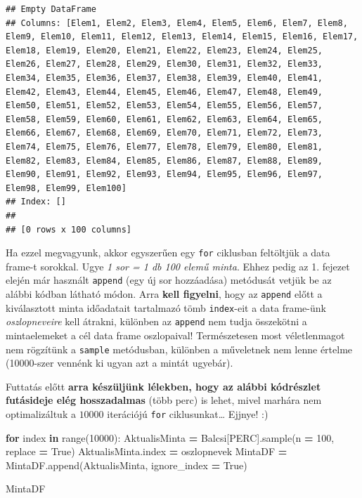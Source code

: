 \documentclass[
]{book}
\newenvironment{Shaded}{\begin{snugshade}}{\end{snugshade}}
\newcommand{\BuiltInTok}[1]{#1}
\newcommand{\ControlFlowTok}[1]{\textcolor[rgb]{0.13,0.29,0.53}{\textbf{#1}}}
\newcommand{\DecValTok}[1]{\textcolor[rgb]{0.00,0.00,0.81}{#1}}
\newcommand{\KeywordTok}[1]{\textcolor[rgb]{0.13,0.29,0.53}{\textbf{#1}}}
\newcommand{\NormalTok}[1]{#1}
\newcommand{\OperatorTok}[1]{\textcolor[rgb]{0.81,0.36,0.00}{\textbf{#1}}}
\newcommand{\StringTok}[1]{\textcolor[rgb]{0.31,0.60,0.02}{#1}}
\newcommand{\VariableTok}[1]{\textcolor[rgb]{0.00,0.00,0.00}{#1}}
\begin{document}
\begin{verbatim}
## Empty DataFrame
## Columns: [Elem1, Elem2, Elem3, Elem4, Elem5, Elem6, Elem7, Elem8, Elem9, Elem10, Elem11, Elem12, Elem13, Elem14, Elem15, Elem16, Elem17, Elem18, Elem19, Elem20, Elem21, Elem22, Elem23, Elem24, Elem25, Elem26, Elem27, Elem28, Elem29, Elem30, Elem31, Elem32, Elem33, Elem34, Elem35, Elem36, Elem37, Elem38, Elem39, Elem40, Elem41, Elem42, Elem43, Elem44, Elem45, Elem46, Elem47, Elem48, Elem49, Elem50, Elem51, Elem52, Elem53, Elem54, Elem55, Elem56, Elem57, Elem58, Elem59, Elem60, Elem61, Elem62, Elem63, Elem64, Elem65, Elem66, Elem67, Elem68, Elem69, Elem70, Elem71, Elem72, Elem73, Elem74, Elem75, Elem76, Elem77, Elem78, Elem79, Elem80, Elem81, Elem82, Elem83, Elem84, Elem85, Elem86, Elem87, Elem88, Elem89, Elem90, Elem91, Elem92, Elem93, Elem94, Elem95, Elem96, Elem97, Elem98, Elem99, Elem100]
## Index: []
## 
## [0 rows x 100 columns]
\end{verbatim}

Ha ezzel megvagyunk, akkor egyszerűen egy \texttt{for} ciklusban feltöltjük a data frame-t sorokkal. Ugye \emph{1 sor = 1 db 100 elemű minta}. Ehhez pedig az 1. fejezet elején már használt \texttt{append} (egy új sor hozzáadása) metódusát vetjük be az alábbi kódban látható módon. Arra \textbf{kell figyelni}, hogy az \texttt{append} előtt a kiválasztott minta időadatait tartalmazó tömb \texttt{index}-eit a data frame-ünk \emph{oszlopneveire} kell átrakni, különben az \texttt{append} nem tudja összekötni a mintaelemeket a cél data frame oszlopaival!
Természetesen most véletlenmagot nem rögzítünk a \texttt{sample} metódusban, különben a műveletnek nem lenne értelme (10000-szer vennénk ki ugyan azt a mintát ugyebár).

Futtatás előtt \textbf{arra készüljünk lélekben, hogy az alábbi kódrészlet futásideje elég hosszadalmas} (több perc) is lehet, mivel marhára nem optimalizáltuk a \(10000\) iterációjú \texttt{for} ciklusunkat\ldots{} Ejjnye! :)

\begin{Shaded}
\begin{Highlighting}[]
\ControlFlowTok{for}\NormalTok{ index }\KeywordTok{in} \BuiltInTok{range}\NormalTok{(}\DecValTok{10000}\NormalTok{):}
\NormalTok{  AktualisMinta }\OperatorTok{=}\NormalTok{ Balcsi[}\StringTok{\textquotesingle{}PERC\textquotesingle{}}\NormalTok{].sample(n }\OperatorTok{=} \DecValTok{100}\NormalTok{, replace }\OperatorTok{=} \VariableTok{True}\NormalTok{)}
\NormalTok{  AktualisMinta.index }\OperatorTok{=}\NormalTok{ oszlopnevek}
\NormalTok{  MintaDF }\OperatorTok{=}\NormalTok{ MintaDF.append(AktualisMinta, ignore\_index }\OperatorTok{=} \VariableTok{True}\NormalTok{)}

\NormalTok{MintaDF}
\end{Highlighting}
\end{Shaded}
\end{document}
